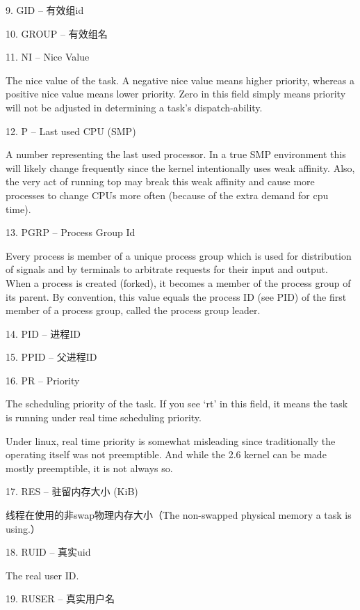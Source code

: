 9. GID  --  有效组id \par

10. GROUP  --  有效组名 \par

11. NI  --  Nice Value  \par
The nice value of the task.  A negative nice value means higher priority, whereas a positive nice value means lower priority.  Zero in this field simply means priority will not be adjusted in determining a task's dispatch-ability.

12. P  --  Last used CPU (SMP)  \par
A number representing the last used processor.  In a true SMP environment this will likely change frequently since the kernel intentionally uses weak affinity.  Also, the very act of running top may break this weak affinity and cause  more  processes  to
change CPUs more often (because of the extra demand for cpu time).

13. PGRP  --  Process Group Id  \par
Every  process  is  member of a unique process group which is used for distribution of signals and by terminals to arbitrate requests for their input and output.  When a process is created (forked), it becomes a member of the process group of its parent.
By convention, this value equals the process ID (see PID) of the first member of a process group, called the process group leader.

14. PID  --  进程ID \par

15. PPID  --  父进程ID \par

16. PR  --  Priority    \par
The scheduling priority of the task.  If you see `rt' in this field, it means the task is running under real time scheduling priority.

Under linux, real time priority is somewhat misleading since traditionally the operating itself was not preemptible.  And while the 2.6 kernel can be made mostly preemptible, it is not always so.

17. RES  --  驻留内存大小 (KiB) \par
\qquad 线程在使用的非swap物理内存大小（The non-swapped physical memory a task is using.）


18. RUID  --  真实uid \par
The real user ID.

19. RUSER  --  真实用户名 \par

